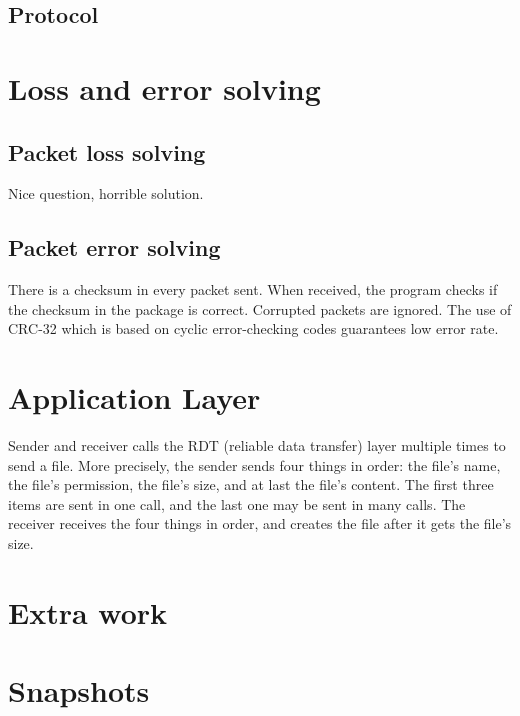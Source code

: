 \documentclass[10pt,a4paper]{article}
\begin{document}
\subsection{Protocol}
\section{Loss and error solving}
    \subsection{Packet loss solving}
        Nice question, horrible solution.
    \subsection{Packet error solving}
        There is a checksum in every packet sent. When received, the program checks if the checksum in the package is correct. Corrupted packets are ignored. The use of CRC-32 which is based on cyclic error-checking codes guarantees low error rate.

\section{Application Layer}
    
    Sender and receiver calls the RDT (reliable data transfer) layer multiple times to send a file. More precisely, the sender sends four things in order: the file's name, the file's permission, the file's size, and at last the file's content. The first three items are sent in one call, and the last one may be sent in many calls. The receiver receives the four things in order, and creates the file after it gets the file's size.

\section{Extra work}
\section{Snapshots}
\end{document}
